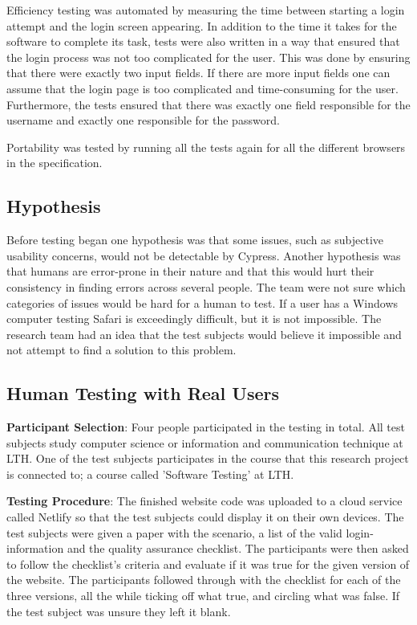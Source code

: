 \documentclass[journal,twocolumn]{IEEEtran}
\begin{document}

Efficiency testing was automated by measuring the time between starting a login attempt and the login screen appearing. In addition to the time it takes for the software to complete its task, tests were also written in a way that ensured that the login process was not too complicated for the user. This was done by ensuring that there were exactly two input fields. If there are more input fields one can assume that the login page is too complicated and time-consuming for the user. Furthermore, the tests ensured that there was exactly one field responsible for the username and exactly one responsible for the password.

Portability was tested by running all the tests again for all the different browsers in the specification.

\subsection{Hypothesis} Before testing began one hypothesis was that some issues, such as subjective usability concerns, would not be detectable by Cypress. Another hypothesis was that humans are error-prone in their nature and that this would hurt their consistency in finding errors across several people. The team were not sure which categories of issues would be hard for a human to test. If a user has a Windows computer testing Safari is exceedingly difficult, but it is not impossible. The research team had an idea that the test subjects would believe it impossible and not attempt to find a solution to this problem.

\subsection{Human Testing with Real Users}
\textbf{Participant Selection}: Four people participated in the testing in total. All test subjects study computer science or information and communication technique at LTH. One of the test subjects participates in the course that this research project is connected to; a course called 'Software Testing' at LTH.

\textbf{Testing Procedure}:
The finished website code was uploaded to a cloud service called Netlify so that the test subjects could display it on their own devices. The test subjects were given a paper with the scenario, a list of the valid login-information and the quality assurance checklist. The participants were then asked to follow the checklist's criteria and evaluate if it was true for the given version of the website. The participants followed through with the checklist for each of the three versions, all the while ticking off what true, and circling what was false. If the test subject was unsure they left it blank.
\end{document}
